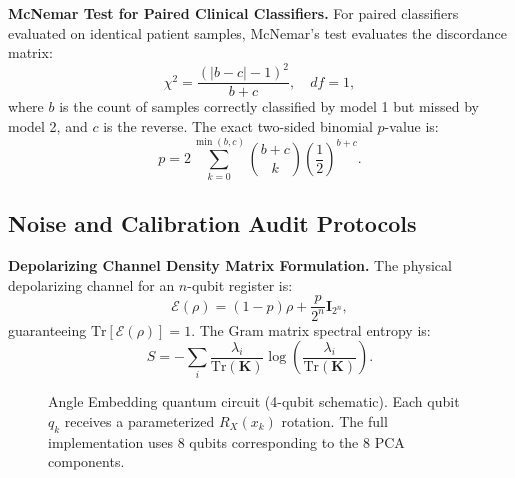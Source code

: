 \documentclass[journal,twocolumn]{IEEEtran}
\begin{document}
\textbf{McNemar Test for Paired Clinical Classifiers.} For paired classifiers evaluated on identical patient samples, McNemar's test evaluates the discordance matrix:
\begin{equation}
    \chi^2 = \frac{(|b - c| - 1)^2}{b + c}, \quad df = 1,
    \label{eq:mcnemar}
\end{equation}
where $b$ is the count of samples correctly classified by model 1 but missed by model 2, and $c$ is the reverse. The exact two-sided binomial $p$-value is:
\begin{equation}
    p = 2 \sum_{k=0}^{\min(b,c)} \binom{b+c}{k} \left(\frac{1}{2}\right)^{b+c}.
    \label{eq:mcnemar_exact}
\end{equation}

\subsection{Noise and Calibration Audit Protocols}

\textbf{Depolarizing Channel Density Matrix Formulation.} The physical depolarizing channel for an $n$-qubit register is:
\begin{equation}
    \mathcal{E}(\rho) = (1 - p)\rho + \frac{p}{2^n}\mathbf{I}_{2^n},
    \label{eq:depolchannel}
\end{equation}
guaranteeing $\text{Tr}[\mathcal{E}(\rho)] = 1$. The Gram matrix spectral entropy is:
\begin{equation}
    S = -\sum_{i} \frac{\lambda_i}{\text{Tr}(\mathbf{K})} \log\!\left(\frac{\lambda_i}{\text{Tr}(\mathbf{K})}\right).
    \label{eq:spectral_entropy}
\end{equation}

\begin{figure}[!t]
\centering
{}
\caption{Angle Embedding quantum circuit (4-qubit schematic). Each qubit $q_k$ receives a parameterized $R_X(x_k)$ rotation. The full implementation uses 8 qubits corresponding to the 8 PCA components.}
\label{fig:circuit}
\end{figure}
\end{document}
